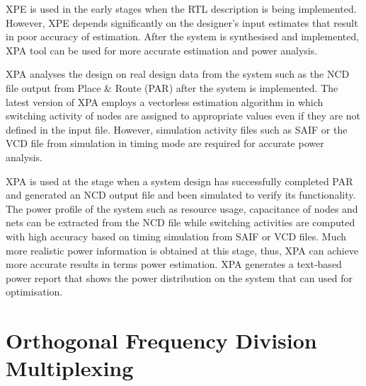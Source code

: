 XPE is used in the early stages when the RTL description is being implemented. 
However, XPE depends significantly on the designer's input estimates that result in poor accuracy of estimation.
After the system is synthesised and implemented, XPA tool can be used for more accurate estimation and power analysis.

XPA analyses the design on real design data from the system such as the NCD file output from Place \& Route (PAR) after the system is implemented. 
The latest version of XPA employs a vectorless estimation algorithm in which switching activity of nodes are assigned to appropriate values even if they are not defined in the input file.
However, simulation activity files such as SAIF or the VCD file from simulation in timing mode are required for accurate power analysis. 

XPA is used at the stage when a system design has successfully completed PAR and generated an NCD output file and been simulated to verify its functionality. 
The power profile of the system such as resource usage, capacitance of nodes and nets can be extracted from the NCD file while switching activities are computed with high accuracy based on timing simulation from SAIF or VCD files. Much more realistic power information is obtained at this stage, thus, XPA can achieve more accurate results in terms power estimation.
XPA generates a text-based power report that shows the power distribution on the system that can used for optimisation.


\section{Orthogonal Frequency Division Multiplexing}

